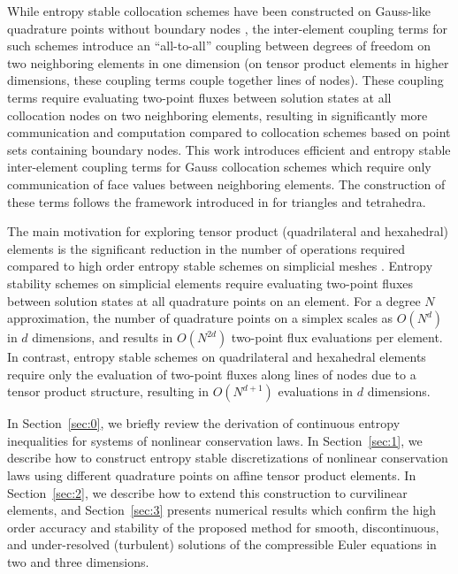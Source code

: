 \documentclass[review,onefignum,onetabnum,final]{siamart171218}
\begin{document}
While entropy stable collocation schemes have been constructed on Gauss-like quadrature points without boundary nodes \cite{crean2017high}, the inter-element coupling terms for such schemes introduce an ``all-to-all'' coupling between degrees of freedom on two neighboring elements in one dimension (on tensor product elements in higher dimensions, these coupling terms couple together lines of nodes).  These coupling terms require evaluating two-point fluxes between solution states at all collocation nodes on two neighboring elements, resulting in significantly more communication and computation compared to collocation schemes based on point sets containing boundary nodes.  This work introduces efficient and entropy stable inter-element coupling terms for Gauss collocation schemes which require only communication of face values between neighboring elements.  The construction of these terms follows the framework introduced in \cite{chan2017discretely, chan2018discretely} for triangles and tetrahedra.  

The main motivation for exploring tensor product (quadrilateral and hexahedral) elements is the significant reduction in the number of operations required compared to high order entropy stable schemes on simplicial meshes \cite{chan2017discretely, chan2018discretely}.  Entropy stability schemes on simplicial elements require evaluating two-point fluxes between solution states at all quadrature points on an element.  For a degree $N$ approximation, the number of quadrature points on a simplex scales as $O(N^d)$ in $d$ dimensions, and results in $O(N^{2d})$ two-point flux evaluations per element.  In contrast, entropy stable schemes on quadrilateral and hexahedral elements require only the evaluation of two-point fluxes along lines of nodes due to a tensor product structure, resulting in $O(N^{d+1})$ evaluations in $d$ dimensions.  

In Section~\ref{sec:0}, we briefly review the derivation of continuous entropy inequalities for systems of nonlinear conservation laws.  In Section~\ref{sec:1}, we describe how to construct entropy stable discretizations of nonlinear conservation laws using different quadrature points on affine tensor product elements.  In Section~\ref{sec:2}, we describe how to extend this construction to curvilinear elements, and Section~\ref{sec:3} presents numerical results which confirm the high order accuracy and stability of the proposed method for smooth, discontinuous, and under-resolved (turbulent) solutions of the compressible Euler equations in two and three dimensions.  
\end{document}
